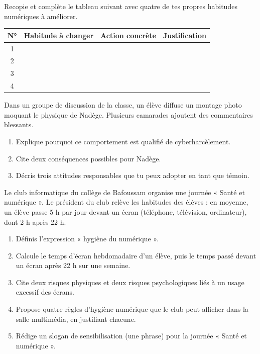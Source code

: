 \documentclass[11pt]{article}
\newcounter{popsec}
\newcounter{popsub}
\newcommand{\courssub}[1]{%
  \stepcounter{popsub}%
  \par\vspace{9pt}\noindent{\popxbold\fontsize{11.5}{13}\selectfont\color{popink}{\color{poporange}\thepopsec.\thepopsub}\hspace{6pt}#1}\par\nopagebreak\vspace{4pt}
}
\begin{document}
\begin{exercice}
Recopie et complète le tableau suivant avec quatre de tes propres habitudes numériques à améliorer.
\begin{center}
\begin{tabularx}{\linewidth}{|c|X|X|X|}
\hline
\rowcolor{popblueL} \textbf{N°} & \textbf{Habitude à changer} & \textbf{Action concrète} & \textbf{Justification} \\
\hline
1 & & & \\
\hline
2 & & & \\
\hline
3 & & & \\
\hline
4 & & & \\
\hline
\end{tabularx}
\end{center}
\end{exercice}

\begin{exercice}
Dans un groupe de discussion de la classe, un élève diffuse un montage photo moquant le physique de Nadège. Plusieurs camarades ajoutent des commentaires blessants.
\begin{enumerate}
\item Explique pourquoi ce comportement est qualifié de cyberharcèlement.
\item Cite deux conséquences possibles pour Nadège.
\item Décris trois attitudes responsables que tu peux adopter en tant que témoin.
\end{enumerate}
\end{exercice}

\courssub{Je me prépare au Probatoire}

\begin{exercice}
Le club informatique du collège de Bafoussam organise une journée « Santé et numérique ». Le président du club relève les habitudes des élèves : en moyenne, un élève passe 5 h par jour devant un écran (téléphone, télévision, ordinateur), dont 2 h après 22 h.
\begin{enumerate}
\item Définis l'expression « hygiène du numérique ».
\item Calcule le temps d'écran hebdomadaire d'un élève, puis le temps passé devant un écran après 22 h sur une semaine.
\item Cite deux risques physiques et deux risques psychologiques liés à un usage excessif des écrans.
\item Propose quatre règles d'hygiène numérique que le club peut afficher dans la salle multimédia, en justifiant chacune.
\item Rédige un slogan de sensibilisation (une phrase) pour la journée « Santé et numérique ».
\end{enumerate}
\end{exercice}
\end{document}
